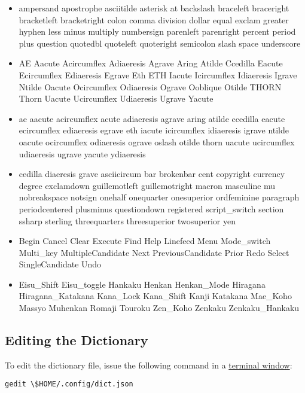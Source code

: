 \documentclass[11pt]{article}
\newcommand{\terminal}{\href{https://help.ubuntu.com/community/UsingTheTerminal}{terminal window}}
\begin{document}
\begin{itemize}
\item ampersand apostrophe asciitilde asterisk at backslash braceleft
  braceright bracketleft bracketright colon comma division dollar
  equal exclam greater hyphen less minus multiply numbersign parenleft
  parenright percent period plus question quotedbl quoteleft
  quoteright semicolon slash space underscore

\item AE Aacute Acircumflex Adiaeresis Agrave Aring Atilde Ccedilla
  Eacute Ecircumflex Ediaeresis Egrave Eth ETH Iacute Icircumflex
  Idiaeresis Igrave Ntilde Oacute Ocircumflex Odiaeresis Ograve
  Ooblique Otilde THORN Thorn Uacute Ucircumflex Udiaeresis Ugrave
  Yacute

\item ae aacute acircumflex acute adiaeresis agrave aring atilde
  ccedilla eacute ecircumflex ediaeresis egrave eth iacute icircumflex
  idiaeresis igrave ntilde oacute ocircumflex odiaeresis ograve oslash
  otilde thorn uacute ucircumflex udiaeresis ugrave yacute ydiaeresis

\item cedilla diaeresis grave asciicircum bar brokenbar cent copyright
  currency degree exclamdown guillemotleft guillemotright macron
  masculine mu nobreakspace notsign onehalf onequarter onesuperior
  ordfeminine paragraph periodcentered plusminus questiondown
  registered script\_switch section ssharp sterling threequarters
  threesuperior twosuperior yen

\item Begin Cancel Clear Execute Find Help Linefeed Menu Mode\_switch
  Multi\_key MultipleCandidate Next PreviousCandidate Prior Redo
  Select SingleCandidate Undo
  
\item Eisu\_Shift Eisu\_toggle Hankaku Henkan Henkan\_Mode Hiragana
  Hiragana\_Katakana Kana\_Lock Kana\_Shift Kanji Katakana Mae\_Koho
  Massyo Muhenkan Romaji Touroku Zen\_Koho Zenkaku Zenkaku\_Hankaku

\end{itemize}

\subsection{Editing the Dictionary}

To edit the dictionary file, issue the following command in a
\terminal:

\begin{lstlisting}
gedit \$HOME/.config/dict.json
\end{lstlisting}
\end{document}
